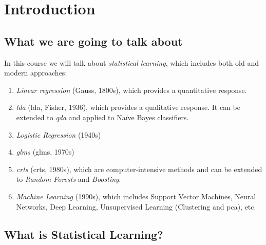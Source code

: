 \chapter{Introduction}

\section{What we are going to talk about}

In this course we will talk about \emph{statistical learning}, which includes both old and modern approaches:
\begin{enumerate}
    \item \emph{Linear regression} (Gauss, 1800s), which provides a quantitative response.
    \item \emph{\acl{lda}} (\acs{lda}, Fisher, 1936), which provides a qualitative response. It can be extended to \emph{\acf{qda}} and applied to Na\"ive Bayes classifiers.
    \item \emph{Logistic Regression} (1940s)
    \item \emph{\aclp{glm}} (\acsp{glm}, 1970s)
    \item \emph{\aclp{crt}} (\acsp{crt}, 1980s), which are computer-intensive methods and can be extended to \emph{Random Forests} and \emph{Boosting}.
    \item \emph{Machine Learning} (1990s), which includes Support Vector Machines, Neural Networks, Deep Learning, Unsupervised Learning (Clustering and \acs{pca}), etc.
\end{enumerate}

\section{What is Statistical Learning?}

